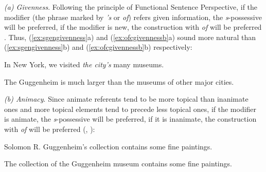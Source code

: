 \textit{(a) Givenness}. Following the principle of Functional Sentence Perspective, if the modifier (the phrase marked by \textit{'s} or \textit{of}) refers given information, the \textit{s}-possessive will be preferred, if the modifier is new, the construction with \textit{of} will be preferred \citep{standwell_genitive_1982}. Thus, (\ref{ex:sgengivenness}a) and (\ref{ex:ofcgivennessb}a) sound more natural than (\ref{ex:sgengivenness}b) and (\ref{ex:ofcgivennessb}b) respectively:

\begin{exe}
\ex
\begin{xlist} 
\label{ex:sgengivenness}
\ex In New York, we visited \textit{the city's} many museums.
\end{xlist}
\end{exe}

\begin{exe}
\ex
\begin{xlist} 
\label{ex:ofcgivennessb}
\ex The Guggenheim is much larger than the museums of other major cities.
\end{xlist}
\end{exe}

\textit{(b) Animacy}. Since animate referents tend to be more topical than inanimate ones and more topical elements tend to precede less topical ones, if the modifier is animate, the \textit{s}-possessive will be preferred, if it is inanimate, the construction with \textit{of} will be preferred (\citealt[cf.][192-203]{quirk_grammar_1972}, \citealt{deane_english_1987}):

\begin{exe}
\ex
\begin{xlist} 
\label{ex:sgenanimacy}
\ex Solomon R. Guggenheim's collection contains some fine paintings.
\end{xlist}
\end{exe}

\begin{exe}
\ex
\begin{xlist} 
\label{ex:ofcanimacy}
\ex The collection of the Guggenheim museum contains some fine paintings.
\end{xlist}
\end{exe}

